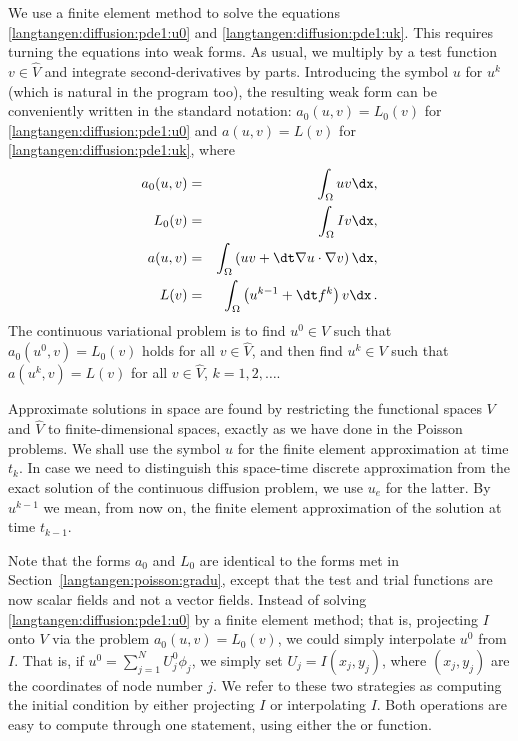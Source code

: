 We use a finite element method
to solve the
equations \eqref{langtangen:diffusion:pde1:u0} and \eqref{langtangen:diffusion:pde1:uk}.
This requires turning the equations into weak forms.
As usual, we multiply by a test function $v\in \hat V$ and integrate
second-derivatives by parts. Introducing the symbol $u$ for $u^k$
(which is natural in the program too), the resulting weak
form can be conveniently written in the standard notation:
$a_0(u,v)=L_0(v)$ for \eqref{langtangen:diffusion:pde1:u0}
and $a(u,v)=L(v)$ for \eqref{langtangen:diffusion:pde1:uk}, where
\begin{eqnarray}
a_0(u,v) &=& \int_\Omega uv\dx,\label{langtangen:diffusion:pde1:a0}\\
L_0(v) &=& \int_\Omega Iv\dx,\label{langtangen:diffusion:pde1:L0}\\
a(u,v) &=& \int_\Omega\left( uv + {\dt}
\nabla u\cdot \nabla v\right)\dx,\label{langtangen:diffusion:pde1:a}\\
L(v) &=& \int_\Omega \left(u^{k-1} + {\dt}  f^k\right)v\dx\langtangenep
\label{langtangen:diffusion:pde1:L}
\end{eqnarray}
The continuous variational problem is to find
$u^0\in V$ such that $a_0(u^0,v)=L_0(v)$ holds for all $v\in\hat V$,
and then find $u^k\in V$
such that $a(u^k,v)=L(v)$ for all $v\in\hat V$,
$k=1,2,\ldots$.

Approximate solutions in space
are found by
restricting the functional spaces $V$ and $\hat V$
to finite-dimensional spaces,
exactly as we have done in the Poisson problems.
We shall use the symbol $u$ for the finite element
approximation at time $t_k$. In case we need to distinguish this
space-time discrete approximation from the exact solution of
the continuous diffusion problem, we use $u_e$ for the latter.
By $u^{k-1}$ we mean, from now on, the finite element approximation
of the solution at time $t_{k-1}$.

Note that the forms $a_0$ and $L_0$ are identical to the forms
met in Section~\ref{langtangen:poisson:gradu}, except that the test and trial
functions are now
scalar fields and not a vector fields.
Instead of solving \eqref{langtangen:diffusion:pde1:u0} by a finite
element method; that is, projecting $I$ onto $V$ via
the problem $a_0(u,v)=L_0(v)$, we could simply interpolate $u^0$ from
$I$. That is, if $u^0=\sum_{j=1}^N U^0_j\phi_j$, we
simply set $U_j=I(x_j,y_j)$, where $(x_j,y_j)$ are the coordinates of
node number $j$. We refer to these two strategies as computing
the initial condition by either projecting $I$ or interpolating $I$.
Both operations are easy to compute through one statement, using either
the  or  function.

